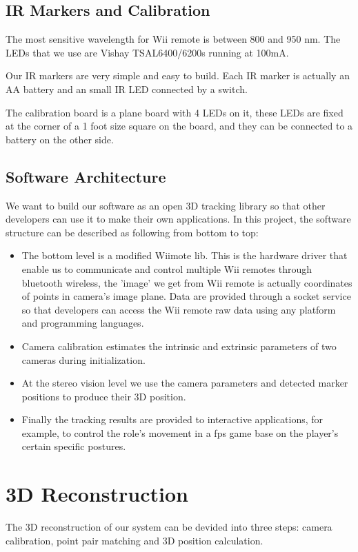 \documentclass[10pt,twocolumn,letterpaper]{article}
\begin{document}
\subsection{IR Markers and Calibration}
The most sensitive wavelength for Wii remote is between 800 and 950 nm.
The LEDs that we use are Vishay TSAL6400/6200s running at 100mA.

Our IR markers are very simple and easy to build. 
Each IR marker is actually an AA battery and an small IR LED
connected by a switch. 

The calibration board is a plane board 
with 4 LEDs on it, these LEDs are fixed 
at the corner of a 1 foot size square on the board, 
and they can be connected to a battery on the other side.

\subsection{Software Architecture}
We want to build our software as an open 3D tracking library so that 
other developers can use it to make their own applications. In this project, 
the software structure can be described as following from bottom to top:
\begin{itemize}
\item The bottom level is a modified Wiimote lib. This is the hardware driver that enable
us to communicate and control multiple Wii remotes through bluetooth wireless, 
the 'image' we get from Wii remote is actually coordinates of points
in camera's image plane. Data are provided through a socket service so that
developers can access the Wii remote raw data using any platform and programming languages.
\item Camera calibration estimates the intrinsic and extrinsic parameters 
of two cameras during initialization.
\item At the stereo vision level we use the camera parameters and detected marker positions
to produce their 3D position.
\item Finally the tracking results are provided to interactive applications, 
for example, to control the role's movement in a fps game base on 
the player's certain specific postures.
\end{itemize}


\section{3D Reconstruction}
The 3D reconstruction of our system can be devided into three steps: camera calibration, point pair matching and 3D position calculation. 
\end{document}
